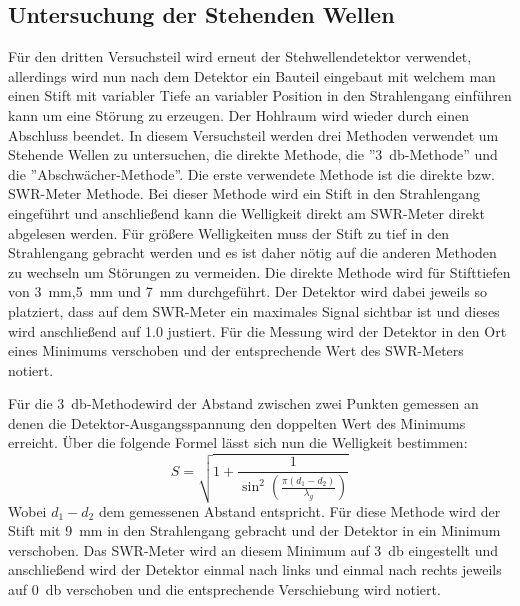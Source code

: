     \subsection{Untersuchung der Stehenden Wellen}
        Für den dritten Versuchsteil wird erneut der Stehwellendetektor verwendet, allerdings wird nun nach dem Detektor ein Bauteil eingebaut mit welchem man einen Stift mit variabler Tiefe an variabler Position in den Strahlengang einführen kann um eine Störung zu erzeugen.
        Der Hohlraum wird wieder durch einen Abschluss beendet.
        In diesem Versuchsteil werden drei Methoden verwendet um Stehende Wellen zu untersuchen, die direkte Methode, die ”\SI{3}{\decibel}-Methode” und die ”Abschwächer-Methode”.
        Die erste verwendete Methode ist die direkte bzw. SWR-Meter Methode.
        Bei dieser Methode wird ein Stift in den Strahlengang eingeführt und anschließend kann die Welligkeit direkt am SWR-Meter direkt abgelesen werden. Für größere Welligkeiten muss der Stift zu tief in den Strahlengang gebracht werden und es ist daher nötig auf die anderen Methoden zu wechseln um Störungen zu vermeiden.
        Die direkte Methode wird für Stifttiefen von \SI{3}{\milli\metre},\SI{5}{\milli\metre} und \SI{7}{\milli\metre} durchgeführt. Der Detektor wird dabei jeweils so platziert, dass auf dem SWR-Meter ein maximales Signal sichtbar ist und dieses wird anschließend auf \num{1.0} justiert. Für die Messung wird der Detektor in den Ort eines Minimums verschoben und der entsprechende Wert des SWR-Meters notiert.

        Für die \glqq \SI{3}{\decibel}-Methode\glqq  wird der Abstand zwischen zwei Punkten gemessen an denen die Detektor-Ausgangsspannung den doppelten Wert des Minimums erreicht. Über die folgende Formel lässt sich nun die Welligkeit bestimmen:
        \begin{equation}
            S = \sqrt{1+\frac{1}{\sin^2\left(\frac{\pi \left(d_1 - d_2\right)}{\lambda_g}\right)}}
        \end{equation}
        Wobei $d_1 - d_2$ dem gemessenen Abstand entspricht.
        Für diese Methode wird der Stift mit \SI{9}{\milli\metre} in den Strahlengang gebracht und der Detektor in ein Minimum verschoben.
        Das SWR-Meter wird an diesem Minimum auf \SI{3}{\decibel} eingestellt und anschließend wird der Detektor einmal nach links und einmal nach rechts jeweils auf \SI{0}{\decibel} verschoben und die entsprechende Verschiebung wird notiert.

